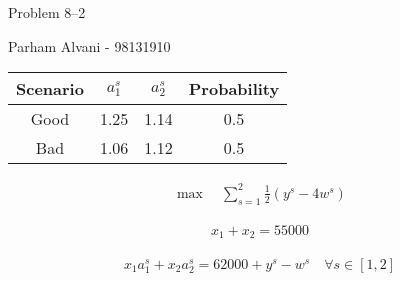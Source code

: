 \documentclass{article}
\begin{document}
{\Large Problem 8--2
        \hfill}

\begin{center}
{\Large Parham Alvani - 98131910}
\end{center}
\vspace{0.05in}

\begin{table}[ht]
        \centering
        \begin{tabular}{|c|c c|c|}
                \hline
                Scenario & \(a_{1}^{s}\) & \(a_{2}^{s}\) & Probability\\
                \hline
                Good & 1.25 & 1.14 & 0.5\\\hline
                Bad & 1.06 & 1.12 & 0.5\\\hline
        \end{tabular}
\end{table}

\begin{align*}
        \max \quad \sum_{s = 1}^{2} \frac{1}{2} (y^{s} - 4 w^{s})
\end{align*}

\begin{align*}
        x_{1} + x_{2} = 55000
\end{align*}

\begin{align*}
        x_{1} a_{1}^{s} + x_{2} a_{2}^{s} = 62000 + y^{s} - w^{s} \quad \forall s \in [1, 2]
\end{align*}
\end{document}
